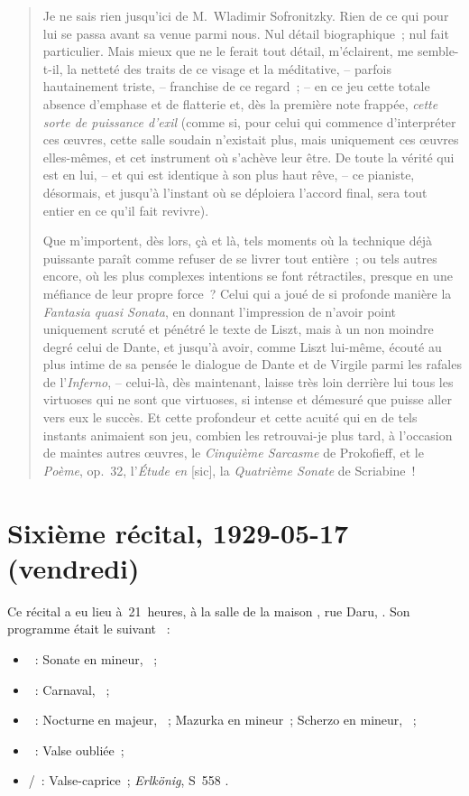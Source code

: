 \begin{quotation}
 Je ne sais rien jusqu'ici de M.~Wladimir Sofronitzky.
 Rien de ce qui pour lui se passa avant sa venue parmi nous.
 Nul détail biographique~; nul fait particulier.
 Mais mieux que ne le ferait tout détail, m'éclairent, me
 \hbox{semble-t-il}, la netteté des traits de ce visage et la méditative, --
 parfois hautainement triste, -- franchise de ce regard~; -- en ce jeu cette
 totale absence d'emphase et de flatterie et, dès la première note frappée,
 \emph{cette sorte de puissance d'exil} (comme si, pour celui qui commence
 d'interpréter ces œuvres, cette salle soudain n'existait plus, mais
 uniquement ces œuvres elles-mêmes, et cet instrument où s'achève leur être.
 De toute la vérité qui est en lui, -- et qui est identique à son plus haut
 rêve, -- ce pianiste, désormais, et jusqu'à l'instant où se déploiera
 l'accord final, sera tout entier en ce qu'il fait revivre).

 Que m'importent, dès lors, çà et là, tels moments où la technique déjà
 puissante paraît comme refuser de se livrer tout entière~; ou tels autres
 encore, où les plus complexes intentions se font rétractiles, presque en
 une méfiance de leur propre force~?
 Celui qui a joué de si profonde manière la \emph{Fantasia quasi Sonata}, en
 donnant l'impression de n'avoir point uniquement scruté et pénétré le texte
 de Liszt, mais à un non moindre degré celui de Dante, et jusqu'à avoir,
 comme Liszt lui-même, écouté au plus intime de sa pensée le dialogue de
 Dante et de Virgile parmi les rafales de l'\emph{Inferno}, -- celui-là, dès
 maintenant, laisse très loin derrière lui tous les virtuoses qui ne sont
 que virtuoses, si intense et démesuré que puisse aller vers eux le succès.
 Et cette profondeur et cette acuité qui en de tels instants animaient son
 jeu, combien les retrouvai-je plus tard, à l'occasion de maintes autres
 œuvres, le \emph{Cinquième Sarcasme} de Prokofieff, et le \emph{Poème},
 op.~32, l'\emph{Étude en \kE \Flat} [sic], la \emph{Quatrième Sonate} de
 Scriabine~!%
\end{quotation}

\section{Sixième récital, 1929-05-17 (vendredi)}
\label{rec:Paris6}

Ce récital a eu lieu à~21~heures, à la salle \Chopin{} de la maison
\Pleyel{}, rue Daru, .
Son programme était le suivant \citep[voir][]{Heugel4854, Nekrasova08,
Semaine363, Semaine364, White}~:
\begin{itemize}
 \item
 \Beethoven{}~: Sonate  en \kC mineur, ~;
 \item
 \Schumann{}~: Carnaval, ~;
 \item
 \Chopin{}~: Nocturne en \kF \Sharp majeur,  ~; Mazurka
 en \kC \Sharp mineur~; Scherzo en \kB mineur, ~;
 \item
 \Liszt{}~: Valse oubliée~;
 \item
 \Schubert{}/\Liszt{}~: Valse-caprice~; \emph{Erlkönig}, S~558 .
\end{itemize}

